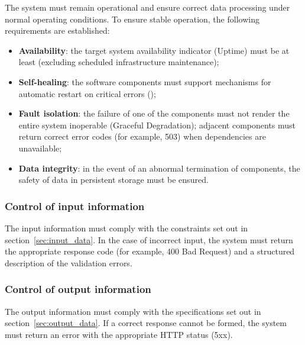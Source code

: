 \documentclass[12pt,a4paper]{extarticle}
\begin{document}
\begin{hseExample}
The system must remain operational and ensure correct data processing under normal operating conditions. To ensure stable operation, the following requirements are established:
\begin{itemize}[nosep, leftmargin=1.25cm]
    \item \textbf{Availability}: the target system availability indicator (Uptime) must be at least  (excluding scheduled infrastructure maintenance);
    \item \textbf{Self-healing}: the software components must support mechanisms for automatic restart on critical errors ();
    \item \textbf{Fault isolation}: the failure of one of the components must not render the entire system inoperable (Graceful Degradation); adjacent components must return correct error codes (for example, 503) when dependencies are unavailable;
    \item \textbf{Data integrity}: in the event of an abnormal termination of components, the safety of data in persistent storage must be ensured.
\end{itemize}
\end{hseExample}

\subsubsection{Control of input information}

\begin{hseExample}
The input information must comply with the constraints set out in section~\ref{sec:input_data}. In the case of incorrect input, the system must return the appropriate response code (for example, 400 Bad Request) and a structured description of the validation errors.
\end{hseExample}

\subsubsection{Control of output information}

\begin{hseExample}
The output information must comply with the specifications set out in section~\ref{sec:output_data}. If a correct response cannot be formed, the system must return an error with the appropriate HTTP status (5xx).
\end{hseExample}
\end{document}
